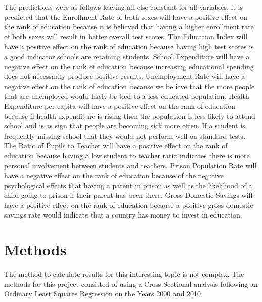 \documentclass[12pt,english]{article}
\begin{document}
The predictions were as follows leaving all else constant for all variables, it is predicted that the Enrollment Rate of both sexes will have a positive effect on the rank of education because it is believed that having a higher enrollment rate of both sexes will result in better overall test scores. The Education Index will have a positive effect on the rank of education because having high test scores is a good indicator schools are retaining students. School Expenditure will have a negative effect on the rank of education because increasing educational spending does not necessarily produce positive results. Unemployment Rate will have a negative effect on the rank of education because we believe that the more people that are unemployed would likely be tied to a less educated population.  Health Expenditure per capita will have a positive effect on the rank of education because if health expenditure is rising then the population is less likely to attend school and is as sign that people are becoming sick more often. If a student is frequently missing school that they would not perform well on standard tests. The Ratio of Pupils to Teacher will have a positive effect on the rank of education because having a low student to teacher ratio indicates there is more personal involvement between students and teachers. Prison Population Rate will have a negative effect on the rank of education because of the negative psychological effects that having a parent  in prison as well as the likelihood of a child going to prison if their parent has been there. Gross Domestic Savings will have a positive effect on the rank of education because a positive gross domestic savings rate would indicate that a country has money to invest in education.

\section{Methods}
The method to calculate results for this interesting topic is not complex. The methods for this project consisted of using a Cross-Sectional analysis following an Ordinary Least Squares Regression on the Years 2000 and 2010.
\end{document}
